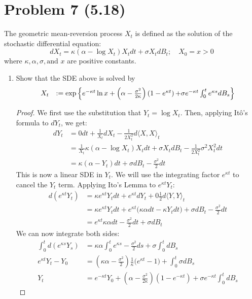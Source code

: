 \documentclass[11pt]{article}
\newcommand\ip[2]{\langle #1, #2 \rangle}
\newcommand{\ga}{\alpha}
\newcommand{\gk}{\kappa}
\newcommand{\gs}{\sigma}
\begin{document}
 \section*{Problem 7 (5.18)}
 The geometric mean-reversion process $X_t$ is defined as the solution of the stochastic differential equation:
 $$d X _ { t } = \kappa \left( \alpha - \log X _ { t } \right) X _ { t } d t + \sigma X _ { t } d B _ { t } ; \quad X _ { 0 } = x > 0$$
 where $\gk, \ga, \gs, \text{and } x$ are positive constants.
 \begin{enumerate}
 \item Show that the SDE above is solved by $$\left. \begin{array} { r l }  X _ { t } &: = \exp \Big\{ e ^ { - \kappa t } \ln x + \left( \alpha - \frac { \sigma ^ { 2 } } { 2 \kappa } \right) \left( 1 - e ^ { \kappa t } \right)    { + \sigma e ^ { - \kappa t } \int _ { 0 } ^ { t } e ^ { \kappa s } d B _ { s } } \Big\} \end{array} \right. $$
 \begin{proof}
We first use the substitution that $Y_t = \log X_t$.  Then, applying It\^o's formula to $dY_t$, we get:
 \begin{align*}
 dY_t&= 0 dt + \frac{1}{X_t}dX_t - \frac{1}{2X_t^2} d \ip{X}{X} _t\\
 &= \frac{1}{X_t}\gk(\ga- \log X_t) X_t dt + \gs X_t d B_t  -\frac{1}{2X_t^2} \gs^2 X_t^2 dt\\
 &= \gk(\ga-Y_t)dt + \gs dB_t -\frac{\gs^2}{2} dt
 \end{align*}
This is now a linear SDE in $Y_t$.  We will use the integrating factor $e^{\gk t}$ to cancel the $Y_t$ term.  Applying Ito's Lemma to $e^{\gk t}Y_t$:
\begin{align*}
d(e^{\gk t}Y_t) &= \gk e^{\gk t}Y_t dt + e^{\gk t} dY_t + 0\frac{1}{2} d \ip{Y}{Y}_t \\
&= \gk e^{\gk t} Y_t dt + e^{\gk t}\big( \gk \ga dt - \gk Y_t dt \big) + \gs dB_t -\frac{\gs^2}{2} dt\\
&=e^{\gk t} \gk \ga dt -\frac{\gs^2}{2} dt + \gs dB_t
\end{align*}
We can now integrate both sides:
\begin{align*}
\int_0^t d(e^{\gk s} Y_s) &= \gk \ga \int_0^t e^{\gk s}- \frac{\gs^2}{2} ds + \gs \int_0^t dB_s\\
e^{\gk t}Y_t - Y_0 &= (\gk \ga-\frac{\gs^2}{2}) \frac{1}{\gk} \big( e^{\gk t}-1\big) + \int_0^t\gs dB_s\\
Y_t &= e^{-\gk t}Y_0 + (\ga - \frac{\gs^2}{2 \gk})(1-e^{-\gk t}) + \gs e^{-\gk t} \int_0^t dB_s

\end{align*}
\end{proof}
\end{enumerate}
\end{document}

